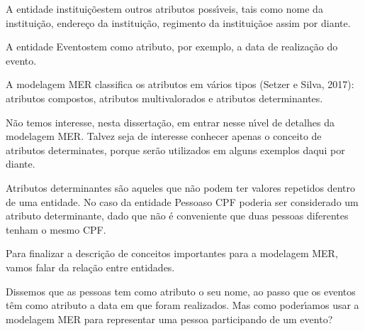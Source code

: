 \documentclass[
12pt,		%
openright,	%
twoside,  %
a4paper,			%
chapter=TITLE,		%
english,			%
french,				%
spanish,			%
brazil				%
]{USPSC-classe/USPSC}
\begin{document}
A entidade \textquotedbl institui\c{c}\~oes\textquotedbl  tem outros atributos poss\'{\i}veis, tais como \textquotedbl nome da institui\c{c}\~ao\textquotedbl , \textquotedbl endere\c{c}o da institui\c{c}\~ao\textquotedbl , \textquotedbl regimento da institui\c{c}\~ao\textquotedbl  e assim por diante.










A entidade \textquotedbl Eventos\textquotedbl  tem como atributo, por exemplo, a data de realiza\c{c}\~ao do evento.










A modelagem MER classifica os atributos em v\'arios tipos (Setzer e Silva, 2017): atributos compostos, atributos multivalorados e atributos determinantes.










N\~ao temos interesse, nesta disserta\c{c}\~ao, em entrar nesse n\'{\i}vel de detalhes da modelagem MER. Talvez seja de interesse conhecer apenas o conceito de \textquotedbl atributos determinates\textquotedbl , porque ser\~ao utilizados em alguns exemplos daqui por diante.










Atributos determinantes s\~ao aqueles que n\~ao podem ter valores repetidos dentro de uma entidade. No caso da entidade \textquotedbl Pessoas\textquotedbl  o CPF poderia ser considerado um atributo determinante, dado que n\~ao \'e conveniente que duas pessoas diferentes tenham o mesmo CPF.










Para finalizar a descri\c{c}\~ao de conceitos importantes para a modelagem MER, vamos falar da rela\c{c}\~ao entre entidades.










Dissemos que as pessoas tem como atributo o seu nome, ao passo que os eventos t\^em como atributo a data em que foram realizados. Mas como poder\'{\i}amos usar a modelagem MER para representar uma pessoa participando de um evento?
\end{document}
